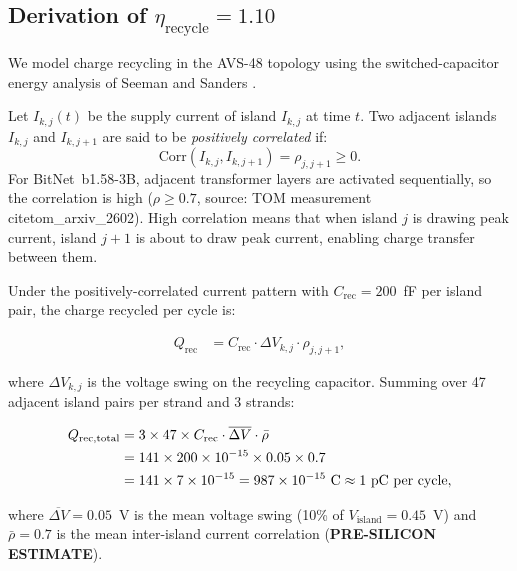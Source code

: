 \subsection{Derivation of $\eta_\mathrm{recycle} = 1.10$}

We model charge recycling in the AVS-48 topology using the
switched-capacitor energy analysis of Seeman and Sanders
\cite{seeman_sc_2008}.

\begin{definition}
\label{def:correlated_current}
Let $I_{k,j}(t)$ be the supply current of island $I_{k,j}$ at time $t$.
Two adjacent islands $I_{k,j}$ and $I_{k,j+1}$ are said to be
\emph{positively correlated} if:
\[
  \mathrm{Corr}(I_{k,j}, I_{k,j+1}) = \rho_{j,j+1} \geq 0.
\]
For BitNet~b1.58-3B, adjacent transformer layers are activated
sequentially, so the correlation is high ($\rho \geq 0.7$, source:
TOM measurement \\cite{tom_arxiv_2602}).  High correlation means that
when island $j$ is drawing peak current, island $j+1$ is about to
draw peak current, enabling charge transfer between them.
\end{definition}

\noindent Under the positively-correlated current pattern with
$C_\mathrm{rec} = 200$~fF per island pair, the charge recycled per
cycle is:

\begin{align}
  Q_\mathrm{rec} &= C_\mathrm{rec} \cdot \Delta V_{k,j} \cdot \rho_{j,j+1},
  \label{eq:q_rec}
\end{align}

\noindent where $\Delta V_{k,j}$ is the voltage swing on the recycling
capacitor.  Summing over 47 adjacent island pairs per strand and 3
strands:

\begin{align}
  Q_\mathrm{rec,total} &= 3 \times 47 \times C_\mathrm{rec} \cdot
    \overline{\Delta V} \cdot \bar{\rho}
  \label{eq:q_rec_total} \\
  &= 141 \times 200 \times 10^{-15} \times 0.05 \times 0.7
  \notag \\
  &= 141 \times 7 \times 10^{-15} = 987 \times 10^{-15}\text{ C}
  \approx 1\text{ pC per cycle},
  \notag
\end{align}

\noindent where $\overline{\Delta V} = 0.05$~V is the mean voltage swing
(10\% of $V_\mathrm{island} = 0.45$~V) and $\bar{\rho} = 0.7$ is the
mean inter-island current correlation (\textbf{PRE-SILICON ESTIMATE}).

